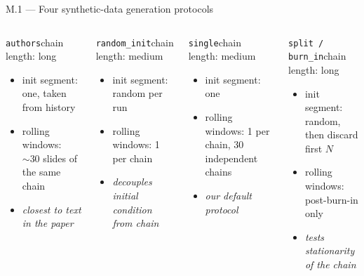 \documentclass[11pt,aspectratio=169]{beamer}
\begin{document}
\begin{frame}{M.1 --- Four synthetic-data generation protocols}
\vspace{-2mm}
\footnotesize
\begin{columns}[T,onlytextwidth]
  \begin{block}{\texttt{authors}\hfill chain length: \alert{long}}
    \begin{itemize}\setlength\itemsep{0pt}
      \item init segment: \alert{one}, taken from history
      \item rolling windows: $\sim\!30$ slides of the same chain
      \item \emph{closest to text in the paper}
    \end{itemize}
  \end{block}
  \begin{block}{\texttt{random\_init}\hfill chain length: medium}
    \begin{itemize}\setlength\itemsep{0pt}
      \item init segment: \alert{random per run}
      \item rolling windows: 1 per chain
      \item \emph{decouples initial condition from chain}
    \end{itemize}
  \end{block}
  \begin{block}{\texttt{single}\hfill chain length: medium}
    \begin{itemize}\setlength\itemsep{0pt}
      \item init segment: one
      \item rolling windows: 1 per chain, 30 independent chains
      \item \emph{our default protocol}
    \end{itemize}
  \end{block}
  \begin{block}{\texttt{split / burn\_in}\hfill chain length: long}
    \begin{itemize}\setlength\itemsep{0pt}
      \item init segment: random, then \alert{discard first $N$}
      \item rolling windows: post-burn-in only
      \item \emph{tests stationarity of the chain}
    \end{itemize}
  \end{block}
\end{columns}


\end{frame}
\end{document}
